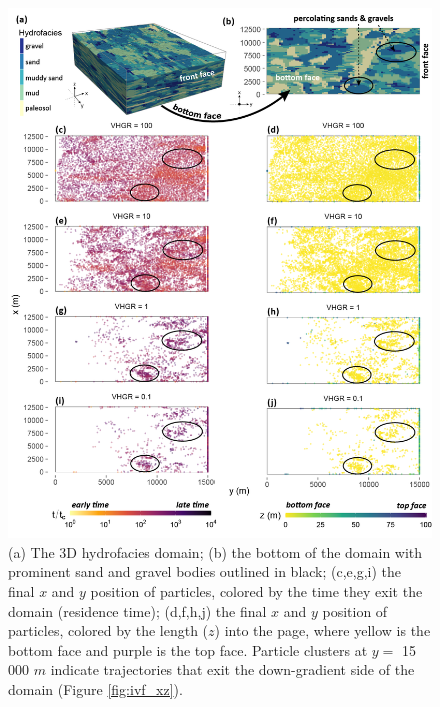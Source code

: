 \begin{figure}[H]
  \includegraphics[width=\textwidth]{ch4_figs/krf_top_face_rtd_low_res-01.png}
  \caption{(a) The 3D hydrofacies domain; (b) the bottom of the domain with prominent sand and gravel bodies outlined in black; (c,e,g,i) the final $x$ and $y$ position of particles, colored by the time they exit the domain (residence time); (d,f,h,j) the final $x$ and $y$ position of particles, colored by the length ($z$) into the page, where yellow is the bottom face and purple is the top face. Particle clusters at $y =$ 15 000 $m$ indicate trajectories that exit the down-gradient side of the domain (Figure \ref{fig:ivf_xz}).}
  \label{fig:bottom_yx}
\end{figure}




